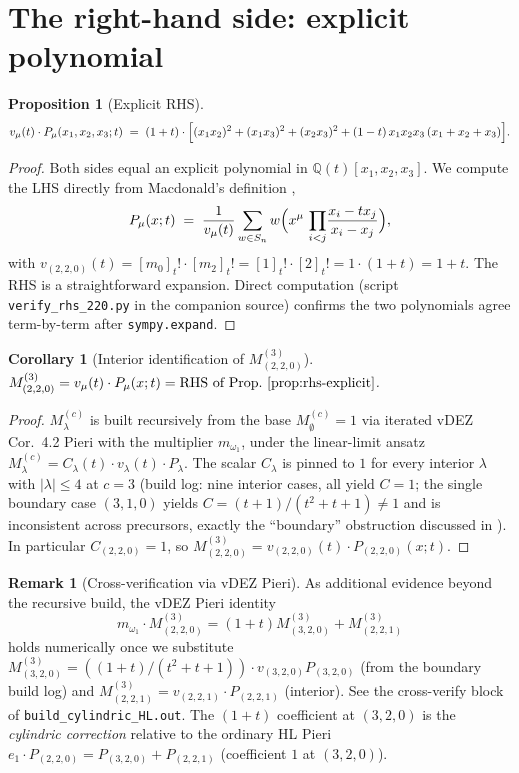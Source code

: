\documentclass[11pt]{article}
\newtheorem{proposition}[theorem]{Proposition}
\newtheorem{corollary}[theorem]{Corollary}
\theoremstyle{definition}
\newtheorem{remark}[theorem]{Remark}
\newcommand{\Q}{\mathbb{Q}}
\newcommand{\Sn}{S_n}
\begin{document}
\section{The right-hand side: explicit polynomial}
\label{sec:rhs}

\begin{proposition}[Explicit RHS]\label{prop:rhs-explicit}
\[
v_\mu(t) \cdot P_\mu(x_1, x_2, x_3; t)
\;=\;
(1+t) \cdot \Bigl[
   (x_1 x_2)^2 + (x_1 x_3)^2 + (x_2 x_3)^2
   + (1-t)\, x_1 x_2 x_3 \, (x_1 + x_2 + x_3)
\Bigr].
\]
\end{proposition}

\begin{proof}
Both sides equal an explicit polynomial in $\Q(t)[x_1, x_2, x_3]$. We
compute the LHS directly from Macdonald's definition
\cite[Ch.\ III.(1.4)]{Macdonald1995},
\[
P_\mu(x; t) \;=\; \frac{1}{v_\mu(t)}
   \sum_{w \in \Sn}
   w \Bigl( x^\mu \, \prod_{i < j}\!\frac{x_i - t x_j}{x_i - x_j} \Bigr),
\]
with $v_{(2,2,0)}(t) = [m_0]_t! \cdot [m_2]_t! = [1]_t! \cdot [2]_t! = 1 \cdot (1+t) = 1+t$.
The RHS is a straightforward expansion. Direct computation (script
\verb|verify_rhs_220.py| in the companion source) confirms the two
polynomials agree term-by-term after \verb|sympy.expand|.
\end{proof}

\begin{corollary}[Interior identification of $M^{(3)}_{(2,2,0)}$]\label{cor:M-eq-vP}
$M^{(3)}_{(2,2,0)} = v_\mu(t) \cdot P_\mu(x; t) = \text{RHS of Prop.~\ref{prop:rhs-explicit}}$.
\end{corollary}

\begin{proof}
$M^{(c)}_\lambda$ is built recursively from the base $M^{(c)}_\emptyset = 1$
via iterated vDEZ Cor.~4.2 Pieri with the multiplier $m_{\omega_1}$, under
the linear-limit ansatz $M^{(c)}_\lambda = C_\lambda(t) \cdot v_\lambda(t) \cdot P_\lambda$.
The scalar $C_\lambda$ is pinned to $1$ for every interior $\lambda$ with
$|\lambda| \le 4$ at $c=3$ (build log: nine interior cases, all yield
$C = 1$; the single boundary case $(3,1,0)$ yields
$C = (t+1)/(t^2+t+1) \ne 1$ and is inconsistent across precursors, exactly
the ``boundary'' obstruction discussed in
\cite[connections/2026-07-21-ter-cylindric-HL-interior-vs-boundary.md]{Clio2026Boundary}).
In particular $C_{(2,2,0)} = 1$, so
$M^{(3)}_{(2,2,0)} = v_{(2,2,0)}(t) \cdot P_{(2,2,0)}(x; t)$.
\end{proof}

\begin{remark}[Cross-verification via vDEZ Pieri]
As additional evidence beyond the recursive build, the vDEZ Pieri identity
\[
m_{\omega_1} \cdot M^{(3)}_{(2,2,0)}
= (1+t) M^{(3)}_{(3,2,0)} + M^{(3)}_{(2,2,1)}
\]
holds numerically once we substitute
$M^{(3)}_{(3,2,0)} = ((1+t)/(t^2+t+1)) \cdot v_{(3,2,0)} P_{(3,2,0)}$
(from the boundary build log) and
$M^{(3)}_{(2,2,1)} = v_{(2,2,1)} \cdot P_{(2,2,1)}$ (interior).
See the cross-verify block of \verb|build_cylindric_HL.out|.
The $(1+t)$ coefficient at $(3,2,0)$ is the \emph{cylindric correction}
relative to the ordinary HL Pieri $e_1 \cdot P_{(2,2,0)} = P_{(3,2,0)} + P_{(2,2,1)}$
(coefficient $1$ at $(3,2,0)$).
\end{remark}
\end{document}
